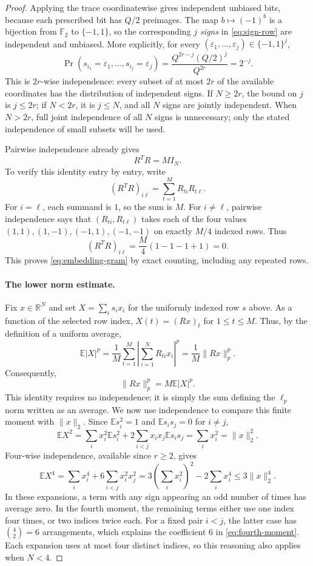 \documentclass[11pt,letterpaper]{article}
\numberwithin{equation}{section}
\theoremstyle{definition}
\theoremstyle{remark}
\newcommand{\R}{\mathbb R}
\newcommand{\F}{\mathbb F}
\newcommand{\E}{\mathbb E}
\begin{document}
\begin{proof}
Applying the trace coordinatewise gives independent unbiased bits, because each prescribed bit has $Q/2$ preimages. The map $b\mapsto(-1)^b$ is a bijection from $\F_2$ to $\{-1,1\}$, so the corresponding \emph{$j$ signs} in \eqref{eq:sign-row} are independent and unbiased. More explicitly, for every $(\varepsilon_1,\ldots,\varepsilon_j)\in\{-1,1\}^j$,
\[
 \Pr(s_{i_1}=\varepsilon_1,\ldots,s_{i_j}=\varepsilon_j)
 =\frac{Q^{2r-j}(Q/2)^j}{Q^{2r}}=2^{-j}.
\]
This is $2r$-wise independence: every subset of at most $2r$ of the available coordinates has the distribution of independent signs. If $N\ge2r$, the bound on $j$ is $j\le2r$; if $N<2r$, it is $j\le N$, and all $N$ signs are jointly independent. When $N>2r$, full joint independence of all $N$ signs is unnecessary; only the stated independence of small subsets will be used.

Pairwise independence already gives
\begin{equation}\label{eq:embedding-gram}
 R^TR=MI_N.
\end{equation}
To verify this identity entry by entry, write
\[
 (R^TR)_{i\ell}=\sum_{t=1}^M R_{ti}R_{t\ell}.
\]
For $i=\ell$, each summand is $1$, so the sum is $M$. For $i\ne\ell$, pairwise independence says that $(R_{ti},R_{t\ell})$ takes each of the four values $(1,1),(1,-1),(-1,1),(-1,-1)$ on exactly $M/4$ indexed rows. Thus
\[
 (R^TR)_{i\ell}=\frac M4(1-1-1+1)=0.
\]
This proves \eqref{eq:embedding-gram} by exact counting, including any repeated rows.

\paragraph{The lower norm estimate.}
Fix $x\in\R^N$ and set $X=\sum_i s_ix_i$ for the uniformly indexed row $s$ above. As a function of the selected row index, $X(t)=(Rx)_t$ for $1\le t\le M$. Thus, by the definition of a uniform average,
\[
 \E|X|^p=\frac1M\sum_{t=1}^M
       \left|\sum_{i=1}^N R_{ti}x_i\right|^p
       =\frac1M\|Rx\|_p^p.
\]
Consequently,
\begin{equation}\label{eq:finite-moment}
 \|Rx\|_p^p=M\E|X|^p.
\end{equation}
This identity requires no independence; it is simply the sum defining the $\ell_p$ norm written as an average. We now use independence to compare this finite moment with $\|x\|_2$. Since $\E s_i^2=1$ and $\E s_is_j=0$ for $i\ne j$,
\[
 \E X^2=\sum_i x_i^2\E s_i^2
             +2\sum_{i<j}x_ix_j\E s_is_j
          =\sum_i x_i^2=\|x\|_2^2.
\]
Four-wise independence, available since $r\ge2$, gives
\begin{equation}\label{eq:fourth-moment}
 \E X^4=\sum_i x_i^4+6\sum_{i<j}x_i^2x_j^2
 =3\left(\sum_i x_i^2\right)^2-2\sum_i x_i^4
 \le3\|x\|_2^4.
\end{equation}
In these expansions, a term with any sign appearing an odd number of times has average zero. In the fourth moment, the remaining terms either use one index four times, or two indices twice each. For a fixed pair $i<j$, the latter case has $\binom42=6$ arrangements, which explains the coefficient $6$ in \eqref{eq:fourth-moment}. Each expansion uses at most four distinct indices, so this reasoning also applies when $N<4$.


\end{proof}
\end{document}
